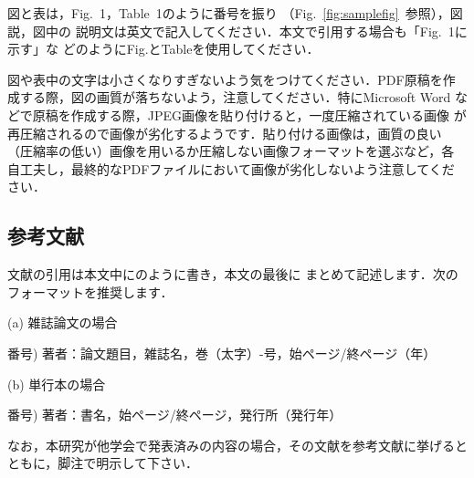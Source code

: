 \documentclass{jarticle}
\begin{document}
図と表は，Fig.~1，Table~1のように番号を振り
（Fig.~\ref{fig:samplefig}\ 参照），図説，図中の
説明文は英文で記入してください．本文で引用する場合も「Fig.~1に示す」な
どのようにFig.とTableを使用してください．

図や表中の文字は小さくなりすぎないよう気をつけてください．PDF原稿を作
成する際，図の画質が落ちないよう，注意してください．特にMicrosoft Word
などで原稿を作成する際，JPEG画像を貼り付けると，一度圧縮されている画像
が再圧縮されるので画像が劣化するようです．貼り付ける画像は，画質の良い
（圧縮率の低い）画像を用いるか圧縮しない画像フォーマットを選ぶなど，各
自工夫し，最終的なPDFファイルにおいて画像が劣化しないよう注意してくだ
さい．

\subsection{参考文献}

文献の引用は本文中に\cite{大会ホームページ}のように書き，本文の最後に
まとめて記述します．次のフォーマットを推奨します．

\noindent
(a) 雑誌論文の場合

\noindent
番号)  著者：論文題目，雑誌名，巻（太字）-号，始ページ/終ページ（年）

\noindent
(b) 単行本の場合

\noindent
番号)  著者：書名，始ページ/終ページ，発行所（発行年）

なお，本研究が他学会で発表済みの内容の場合，その文献を参考文献に挙げるとともに，脚注で明示して下さい．

\small
\begin{thebibliography}{3}



\end{thebibliography}
\end{document}
